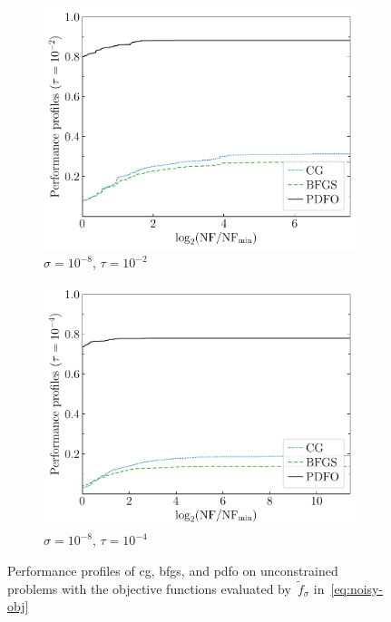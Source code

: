 \documentclass[
    smallextended,  %
    final,          %
]{svjour3}
\newcommand{\obj}{f}
\begin{document}
\begin{figure}[htbp]
\begin{subfigure}{.48\textwidth}
        \includegraphics[width=\textwidth]{perf-noisy-bfgs_cg_pdfo-50-8-2.pdf}
        \caption{$\sigma = 10^{-8}$, $\tau = 10^{-2}$}
    \end{subfigure}
    \hfill
    \begin{subfigure}{.48\textwidth}
        \centering
        \includegraphics[width=\textwidth]{perf-noisy-bfgs_cg_pdfo-50-8-4.pdf}
        \caption{$\sigma = 10^{-8}$, $\tau = 10^{-4}$}
    \end{subfigure}
    \caption{Performance profiles of \gls{cg}, \gls{bfgs}, and \gls{pdfo} on unconstrained problems
    with the objective functions evaluated by~$\tilde{\obj}_\sigma$ in~\eqref{eq:noisy-obj}}
    \label{fig:noise}
\end{figure}
\end{document}
